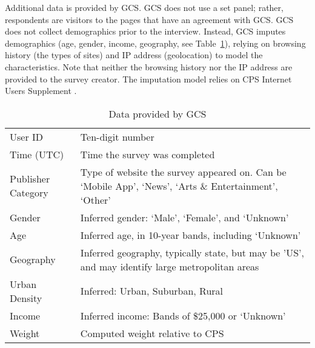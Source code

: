 Additional data is provided by \ac{GCS}. \ac{GCS} does not use a set panel; rather, respondents are visitors to the pages that have an agreement with \ac{GCS}. \ac{GCS} does not collect demographics prior to the interview. Instead, \ac{GCS} imputes demographics  (age, gender, income, geography, see Table~\ref{tab:data}), relying on browsing history (the types of sites) and IP address (geolocation) to model the characteristics. Note that neither the browsing history nor the IP address are provided to the survey creator. The imputation model relies on CPS Internet Users Supplement \citep{varianGoogle2015}.

\begin{table}
	\caption{\label{tab:data}Data provided by GCS}
\begin{tabular}{lp{4in}}
\hline
User ID	& Ten-digit number \\
Time (UTC) & Time the survey was completed\\
Publisher Category& Type of website the survey appeared on. Can be `Mobile App', `News', `Arts \& Entertainment', `Other'\\
Gender & Inferred gender: `Male', `Female', and `Unknown'\\
Age	& Inferred age, in 10-year bands, including `Unknown'\\
Geography	& Inferred geography, typically state, but may be 'US', and may identify large metropolitan areas\\
Urban Density& Inferred: Urban, Suburban, Rural\\
Income & Inferred income: Bands of \$25,000 or `Unknown'\\
Weight & Computed weight relative to CPS\\
\hline
\end{tabular}
\end{table}
